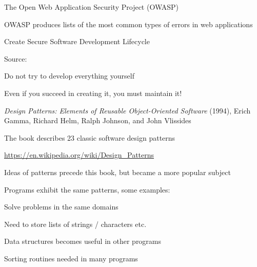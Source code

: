 \documentclass[Screen16to9,17pt]{foils}
\begin{document}
\begin{list1}
\item The Open Web Application Security Project (OWASP)
\item OWASP produces lists of the most common types of errors in web applications
\item {}
\item Create Secure Software Development Lifecycle
\end{list1}








Source:





\begin{quote}

\end{quote}

\begin{list2}
\item Do not try to develop everything yourself
\item Even if you succeed in creating it, you must maintain it!
\end{list2}


\begin{list2}
\item \emph{Design Patterns: Elements of Reusable Object-Oriented Software} (1994), Erich Gamma, Richard Helm, Ralph Johnson, and John Vlissides
\item The book describes 23 classic software design patterns
\item \url{https://en.wikipedia.org/wiki/Design_Patterns}
\item Ideas of patterns precede this book, but became a more popular subject
\end{list2}



\begin{list2}
\item Programs exhibit the same patterns, some examples:
\item Solve problems in the same domains
\item Need to store lists of strings / characters etc.
\item Data structures becomes useful in other programs
\item Sorting routines needed in many programs
\end{list2}
\end{document}
